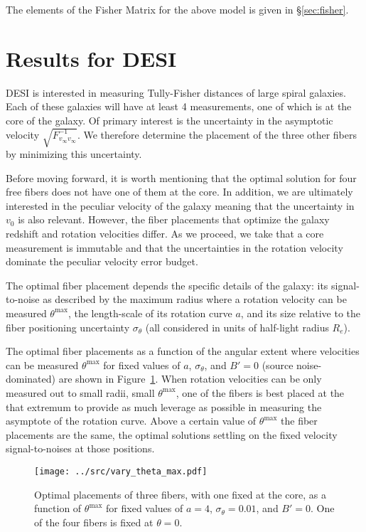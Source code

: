 \documentclass[11pt, oneside]{article}   	%
\begin{document}
The elements of the Fisher Matrix for the above model is given in \S\ref{sec:fisher}.

\section{Results for DESI}
DESI is interested in measuring Tully-Fisher distances of large spiral galaxies. Each of these galaxies will have at
least 4 measurements, one of which is at the core of the galaxy.  
Of primary interest is the uncertainty in the asymptotic velocity $\sqrt{F^{-1}_{v_\infty v_\infty}}$.
We therefore determine the placement of the three other fibers by minimizing this uncertainty.

Before moving forward, it is worth mentioning that the optimal solution for four free fibers does not have one of them
at the core.  In addition, we are ultimately interested in the peculiar velocity of the galaxy meaning that
the uncertainty in $v_0$ is also relevant.  However, the fiber placements that optimize the galaxy redshift and rotation velocities differ.
As we proceed, we take that a core measurement is immutable and that  the uncertainties in the rotation velocity
dominate the peculiar velocity error budget.

The optimal fiber placement depends the specific details of the galaxy: its signal-to-noise
as described by the maximum radius where a rotation velocity can be measured $\theta^\text{max}$,
 the length-scale of its rotation curve $a$, and its size relative
to the fiber positioning uncertainty $\sigma_\theta$ (all considered in units of half-light radius $R_e$).

The optimal fiber placements as a function of the angular extent where velocities can be measured
$\theta^\text{max}$ for fixed values of $a$, $\sigma_\theta$,
and $B'=0$ (source noise-dominated) are shown in Figure~\ref{fig:theta_max}.  When rotation velocities can be only measured
out to small radii, small $\theta^\text{max}$, one of the fibers is best placed at the that extremum to provide
as much leverage as possible in measuring the asymptote of the rotation curve.  Above a certain value
of  $\theta^\text{max}$ the fiber placements are the same, the optimal solutions
settling on the fixed velocity signal-to-noises at those positions.

\begin{figure}[htbp] %
   \centering
   \texttt{[image: ../src/vary\_theta\_max.pdf]} 
   \caption{Optimal placements of three fibers, with one fixed at the core, as a function of $\theta^\text{max}$ for fixed values of $a=4$, $\sigma_\theta=0.01$,
and $B'=0$. One of the four fibers is fixed at $\theta=0$.}
   \label{fig:theta_max}
\end{figure}
\end{document}
